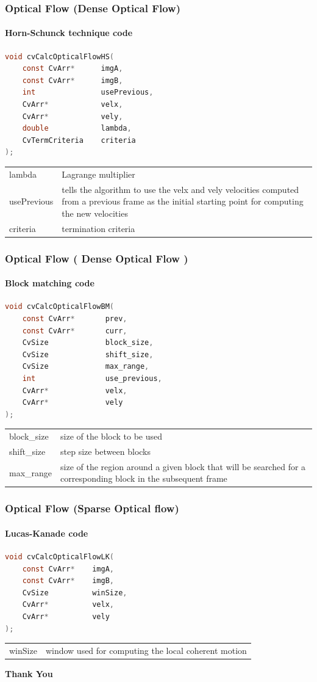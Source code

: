 \documentclass[usenames,dvipsnames]{beamer}
\begin{document}
\begin{frame}[fragile]
\frametitle{Optical Flow (Dense Optical Flow)}
\framesubtitle{Horn-Schunck technique code}
\begin{lstlisting}[language=c]
void cvCalcOpticalFlowHS(
	const CvArr*      imgA,
	const CvArr*      imgB,
	int               usePrevious,
	CvArr*            velx,
	CvArr*            vely,
	double            lambda,
	CvTermCriteria    criteria
);
\end{lstlisting}
\begin{tabular}{ll}
lambda & Lagrange multiplier\\
usePrevious & tells the algorithm to use the velx and vely velocities
computed from a previous frame as the initial starting point for computing the new velocities\\
criteria & termination criteria\\
\end{tabular}
\end{frame}
\begin{frame}[fragile]
\frametitle{Optical Flow ( Dense Optical Flow )}
\framesubtitle{Block matching code}
\begin{lstlisting}[language=c]
void cvCalcOpticalFlowBM(
	const CvArr*       prev,
	const CvArr*       curr,
	CvSize             block_size,
	CvSize             shift_size,
	CvSize             max_range,
	int                use_previous,
	CvArr*             velx,
	CvArr*             vely
);
\end{lstlisting}
\begin{tabular}{ll}
block\_size & size of the block to be used\\
shift\_size & step size between blocks\\
max\_range & size of the region around a given block that will be searched for a corresponding block in the subsequent frame\\
\end{tabular}
\end{frame}
\begin{frame}[fragile]
\frametitle{Optical Flow (Sparse Optical flow)}
\framesubtitle{Lucas-Kanade code}
\begin{lstlisting}[language=c]
void cvCalcOpticalFlowLK(
	const CvArr*    imgA,
	const CvArr*    imgB,
	CvSize          winSize,
	CvArr*          velx,
	CvArr*          vely
);
\end{lstlisting}
\begin{tabular}{ll}
winSize & window used for
computing the local coherent motion\\
\end{tabular}
\end{frame}
\begin{frame}{\phantom{}}
  \color{Sepia}
  \centering \Huge\textbf{Thank You}
\end{frame}
\end{document}
